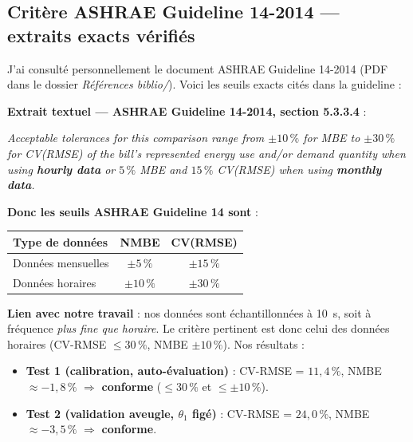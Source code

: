 \documentclass[11pt,a4paper]{article}
\begin{document}
\subsection{Critère ASHRAE Guideline 14-2014 — extraits exacts vérifiés}\label{sec:ashrae_extract}

\begin{honnete}
J'ai consulté personnellement le document ASHRAE Guideline 14-2014 (PDF dans le dossier
\emph{Références biblio/}). Voici les seuils exacts cités dans la guideline :
\end{honnete}

\textbf{Extrait textuel — ASHRAE Guideline 14-2014, section 5.3.3.4} :

\begin{tcolorbox}[breakable,enhanced jigsaw,colback=yellow!10,colframe=yellow!50!black,boxrule=0.4pt,arc=2pt]
\og{} \emph{Acceptable tolerances for this comparison range from $\pm 10\,\%$ for MBE to
$\pm 30\,\%$ for CV(RMSE) of the bill's represented energy use and/or demand quantity
when using \textbf{hourly data} or $5\,\%$ MBE and $15\,\%$ CV(RMSE) when using
\textbf{monthly data}.} \fg{}
\end{tcolorbox}

\textbf{Donc les seuils ASHRAE Guideline 14 sont} :

\begin{center}
\renewcommand{\arraystretch}{1.3}
\begin{tabular}{lcc}
\toprule
\textbf{Type de données} & \textbf{NMBE} & \textbf{CV(RMSE)} \\
\midrule
Données mensuelles & $\pm 5\,\%$ & $\pm 15\,\%$ \\
Données horaires & $\pm 10\,\%$ & $\pm 30\,\%$ \\
\bottomrule
\end{tabular}
\end{center}

\textbf{Lien avec notre travail} : nos données sont échantillonnées à \SI{10}{\second}, soit
à fréquence \emph{plus fine que horaire}. Le critère pertinent est donc celui des
données horaires (CV-RMSE $\le 30\,\%$, NMBE $\pm 10\,\%$). Nos résultats :
\begin{itemize}[itemsep=0pt]
\item \textbf{Test 1 (calibration, auto-évaluation)} : CV-RMSE = $11{,}4\,\%$, NMBE
$\approx -1{,}8\,\%$ $\Rightarrow$ \textbf{conforme} ($\le 30\,\%$ et $\le \pm 10\,\%$).
\item \textbf{Test 2 (validation aveugle, $\theta_1$ figé)} : CV-RMSE = $24{,}0\,\%$,
NMBE $\approx -3{,}5\,\%$ $\Rightarrow$ \textbf{conforme}.
\end{itemize}
\end{document}

